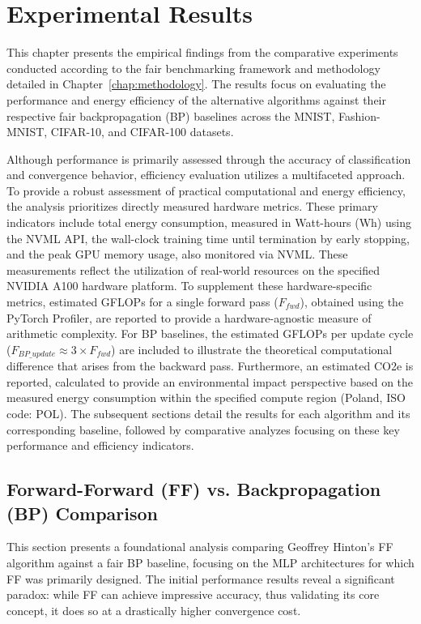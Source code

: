 \section{Experimental Results}
\label{chap:experiments}
This chapter presents the empirical findings from the comparative experiments conducted according to the fair benchmarking framework and methodology detailed in Chapter~\ref{chap:methodology}. The results focus on evaluating the performance and energy efficiency of the alternative algorithms against their respective fair backpropagation (BP) baselines across the MNIST, Fashion-MNIST, CIFAR-10, and CIFAR-100 datasets.

Although performance is primarily assessed through the accuracy of classification and convergence behavior, efficiency evaluation utilizes a multifaceted approach. To provide a robust assessment of practical computational and energy efficiency, the analysis prioritizes directly measured hardware metrics. These primary indicators include total energy consumption, measured in Watt-hours (Wh) using the NVML API, the wall-clock training time until termination by early stopping, and the peak GPU memory usage, also monitored via NVML. These measurements reflect the utilization of real-world resources on the specified NVIDIA A100 hardware platform. To supplement these hardware-specific metrics, estimated GFLOPs for a single forward pass ($F_{fwd}$), obtained using the PyTorch Profiler, are reported to provide a hardware-agnostic measure of arithmetic complexity. For BP baselines, the estimated GFLOPs per update cycle ($F_{BP\_update} \approx 3 \times F_{fwd}$) are included to illustrate the theoretical computational difference that arises from the backward pass. Furthermore, an estimated CO2e is reported, calculated to provide an environmental impact perspective based on the measured energy consumption within the specified compute region (Poland, ISO code: POL). The subsequent sections detail the results for each algorithm and its corresponding baseline, followed by comparative analyzes focusing on these key performance and efficiency indicators.

\subsection{Forward-Forward (FF) vs. Backpropagation (BP) Comparison}
\label{sec:exp_ff_vs_bp}
This section presents a foundational analysis comparing Geoffrey Hinton's FF algorithm against a fair BP baseline, focusing on the MLP architectures for which FF was primarily designed. The initial performance results reveal a significant paradox: while FF can achieve impressive accuracy, thus validating its core concept, it does so at a drastically higher convergence cost.

